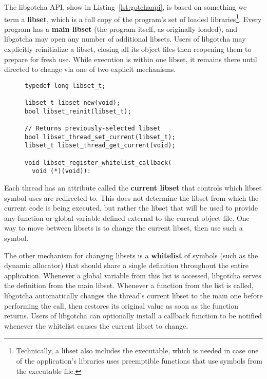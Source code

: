 The libgotcha API, show in Listing~\ref{lst:gotchaapi}, is based on something we term
a \textbf{libset}, which is a full copy of the program's set of loaded
libraries\footnote{Technically, a libset also includes the executable, which is
needed in case one of the application's libraries uses preemptible functions that use
symbols from the executable file.}.  Every program has a \textbf{main libset} (the
program itself, as originally loaded), and libgotcha may open any number of
additional libsets.  Users of libgotcha may explicitly reinitialize a libset, closing
all its object files then reopening them to prepare for fresh use.  While execution
is within one libset, it remains there until directed to change via one of two
explicit mechanisms.

\begin{figure}
\begin{lstlisting}[label=lst:gotchaapi,caption=libgotcha C interface]
typedef long libset_t;

libset_t libset_new(void);
bool libset_reinit(libset_t);

// Returns previously-selected libset
bool libset_thread_set_current(libset_t);
libset_t libset_thread_get_current(void);

void libset_register_whitelist_callback(
  void (*)(void)):
\end{lstlisting}
\end{figure}

Each thread has an attribute called the \textbf{current libset} that controls which
libset symbol uses are redirected to.  This does not determine the libset from which
the current code is being executed, but rather the libset that will be used to
provide any function or global variable defined external to the current object file.
One way to move between libsets is to change the current libset, then use such a
symbol.

The other mechanism for changing libsets is a \textbf{whitelist} of symbols (such as
the dynamic allocator) that should share a single definition throughout the entire
application.  Whenever a global variable from this list is accessed, libgotcha serves
the definition from the main libset.  Whenever a function from the list is called,
libgotcha automatically changes the thread's current libset to the main one before
performing the call, then restores its original value as soon as the function
returns.  Users of libgotcha can optionally install a callback function to be
notified whenever the whitelist causes the current libset to change.

